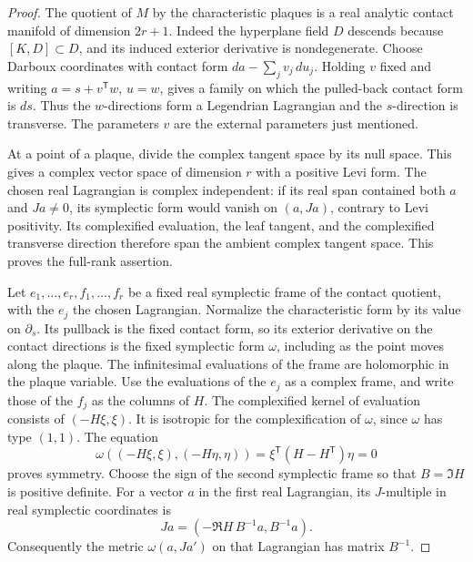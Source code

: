 \begin{proof}
The quotient of $M$ by the characteristic plaques is a real analytic
contact manifold of dimension $2r+1$.  Indeed the hyperplane field $D$
descends because $[K,D]\subset D$, and its induced exterior derivative is
nondegenerate.  Choose Darboux coordinates with contact form
$da-\sum_j v_j\,du_j$.  Holding $v$ fixed and writing
$a=s+v^{\mathsf T}w$, $u=w$, gives a family on which the pulled-back
contact form is $ds$.  Thus the $w$-directions form a Legendrian
Lagrangian and the $s$-direction is transverse.  The parameters $v$ are
the external parameters just mentioned.

At a point of a plaque, divide the complex tangent space by its null
space.  This gives a complex vector space of dimension $r$ with a positive
Levi form.  The chosen real Lagrangian is complex independent: if its
real span contained both $a$ and $Ja\ne0$, its symplectic form would
vanish on $(a,Ja)$, contrary to Levi positivity.  Its complexified
evaluation, the leaf tangent, and the complexified transverse direction
therefore span the ambient complex tangent space.  This proves the
full-rank assertion.

Let $e_1,\ldots,e_r,f_1,\ldots,f_r$ be a fixed real symplectic frame of
the contact quotient, with the $e_j$ the chosen Lagrangian.  Normalize
the characteristic form by its value on $\partial_s$.  Its pullback is
the fixed contact form, so its exterior derivative on the contact
directions is the fixed symplectic form $\omega$, including as the point
moves along the plaque.  The infinitesimal evaluations of the frame are
holomorphic in the plaque variable.  Use the evaluations of the $e_j$
as a complex frame, and write those of the $f_j$ as the columns of $H$.
The complexified kernel of evaluation consists of $(-H\xi,\xi)$.
It is isotropic for the complexification of $\omega$, since $\omega$
has type $(1,1)$.  The equation
\[
 \omega((-H\xi,\xi),(-H\eta,\eta))
                =\xi^{\mathsf T}(H-H^{\mathsf T})\eta=0
\]
proves symmetry.  Choose the sign of the second symplectic frame so that
$B=\Im H$ is positive definite.  For a vector $a$ in the first real
Lagrangian, its $J$-multiple in real symplectic coordinates is
\[
                  Ja=(-\Re H\,B^{-1}a,B^{-1}a).
\]
Consequently the metric $\omega(a,Ja')$ on that Lagrangian has matrix
$B^{-1}$.


\end{proof}
